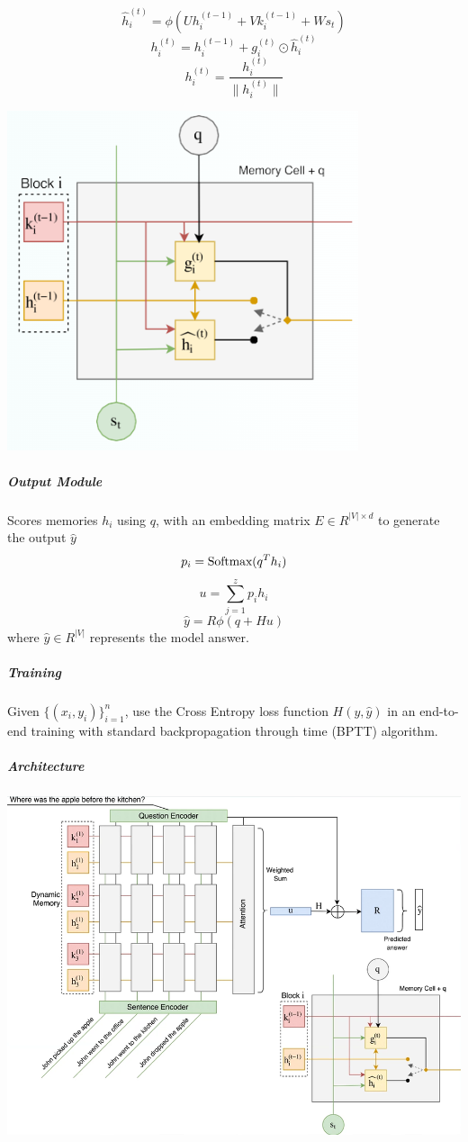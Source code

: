 \documentclass[10pt]{report}
\begin{document}
$$\hat{h}_i^{(t)} = \phi(Uh_i^{(t-1)} + Vk_i^{(t-1)} + Ws_t)$$
$$h_i^{(t)} = h_i^{(t-1)} + g_i^{(t)}\odot\hat{h}_i^{(t)}$$
$$h_i^{(t)}= \frac{h_i^{(t)}}{\|h_i^{(t)}\|}$$
\begin{center}
	\includegraphics[scale=0.5]{99.png}
\end{center}
\subparagraph{Output Module} Scores memories $h_i$ using $q$, with an embedding matrix $E\in R^{|V|\times d}$ to generate the output $\hat{y}$
$$p_i = \hbox{Softmax}(q^Th_i)$$
$$u = \sum_{j=1}^z p_ih_i$$
$$\hat{y} = R\phi(q + Hu)$$
where $\hat{y}\in R^{|V|}$ represents the model answer.
\subparagraph{Training} Given $\{(x_i,y_i)\}_{i=1}^n$, use the Cross Entropy loss function $H(y,\hat{y})$ in an end-to-end training with standard backpropagation through time (BPTT) algorithm.
\pagebreak
\subparagraph{Architecture}
\begin{center}
	\includegraphics[scale=0.5]{98.png}
\end{center}
\end{document}
